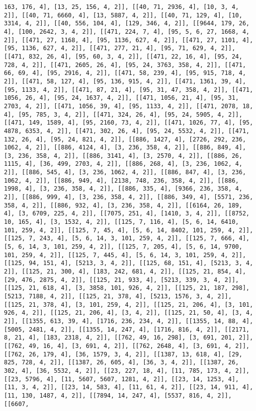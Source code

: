 \documentclass[12pt,fleqn]{article}\usepackage{../../common}
\begin{document}
\begin{verbatim}
163, 176, 4], [13, 25, 156, 4, 2]], [[40, 71, 2936, 4], [10, 3, 4, 2]], [[40, 71, 6660, 4], [13, 5887, 4, 2]], [[40, 71, 129, 4], [10, 3314, 4, 2]], [[40, 556, 104, 4], [129, 346, 4, 2]], [[9644, 179, 26, 4], [100, 2642, 3, 4, 2]], [[471, 224, 7, 4], [95, 5, 6, 27, 1668, 4, 2]], [[471, 27, 1168, 4], [95, 1136, 627, 4, 2]], [[471, 27, 1101, 4], [95, 1136, 627, 4, 2]], [[471, 277, 21, 4], [95, 71, 629, 4, 2]], [[471, 832, 26, 4], [95, 60, 3, 4, 2]], [[471, 22, 16, 4], [95, 24, 728, 4, 2]], [[471, 2605, 26, 4], [95, 24, 3763, 358, 4, 2]], [[471, 66, 69, 4], [95, 2916, 4, 2]], [[471, 58, 239, 4], [95, 915, 718, 4, 2]], [[471, 58, 127, 4], [95, 136, 915, 4, 2]], [[471, 1361, 39, 4], [95, 1133, 4, 2]], [[471, 87, 21, 4], [95, 31, 47, 358, 4, 2]], [[471, 1056, 26, 4], [95, 24, 1637, 4, 2]], [[471, 1056, 21, 4], [95, 31, 2703, 4, 2]], [[471, 1056, 39, 4], [95, 1133, 4, 2]], [[471, 2078, 18, 4], [95, 785, 3, 4, 2]], [[471, 324, 26, 4], [95, 24, 5905, 4, 2]], [[471, 149, 1589, 4], [95, 2160, 73, 4, 2]], [[471, 1026, 77, 4], [95, 4878, 6353, 4, 2]], [[471, 302, 26, 4], [95, 24, 5532, 4, 2]], [[471, 132, 26, 4], [95, 24, 821, 4, 2]], [[886, 1427, 4], [2726, 292, 236, 1062, 4, 2]], [[886, 4124, 4], [3, 236, 358, 4, 2]], [[886, 849, 4], [3, 236, 358, 4, 2]], [[886, 3141, 4], [3, 2570, 4, 2]], [[886, 26, 1115, 4], [36, 499, 2703, 4, 2]], [[886, 268, 4], [3, 236, 1062, 4, 2]], [[886, 545, 4], [3, 236, 1062, 4, 2]], [[886, 847, 4], [3, 236, 1062, 4, 2]], [[886, 949, 4], [2138, 748, 236, 358, 4, 2]], [[886, 1998, 4], [3, 236, 358, 4, 2]], [[886, 335, 4], [9366, 236, 358, 4, 2]], [[886, 999, 4], [3, 236, 358, 4, 2]], [[886, 349, 4], [5571, 236, 358, 4, 2]], [[886, 932, 4], [3, 236, 358, 4, 2]], [[6164, 26, 189, 4], [3, 6709, 225, 4, 2]], [[7075, 251, 4], [1410, 3, 4, 2]], [[8752, 10, 165, 4], [3, 1532, 4, 2]], [[125, 7, 116, 4], [5, 6, 14, 6410, 101, 259, 4, 2]], [[125, 7, 45, 4], [5, 6, 14, 8402, 101, 259, 4, 2]], [[125, 7, 243, 4], [5, 6, 14, 3, 101, 259, 4, 2]], [[125, 7, 666, 4], [5, 6, 14, 3, 101, 259, 4, 2]], [[125, 7, 205, 4], [5, 6, 14, 9700, 101, 259, 4, 2]], [[125, 7, 445, 4], [5, 6, 14, 3, 101, 259, 4, 2]], [[125, 94, 151, 4], [5213, 3, 4, 2]], [[125, 68, 151, 4], [5213, 3, 4, 2]], [[125, 21, 300, 4], [183, 242, 681, 4, 2]], [[125, 21, 854, 4], [29, 476, 2875, 4, 2]], [[125, 21, 933, 4], [5213, 339, 3, 4, 2]], [[125, 21, 618, 4], [3, 3858, 101, 926, 4, 2]], [[125, 21, 187, 298], [5213, 7188, 4, 2]], [[125, 21, 378, 4], [5213, 1576, 3, 4, 2]], [[125, 21, 378, 4], [3, 101, 259, 4, 2]], [[125, 21, 206, 4], [3, 101, 926, 4, 2]], [[125, 21, 206, 4], [3, 4, 2]], [[125, 21, 50, 4], [3, 4, 2]], [[1355, 613, 39, 4], [1716, 236, 234, 4, 2]], [[1355, 14, 88, 4], [5005, 2481, 4, 2]], [[1355, 14, 247, 4], [1716, 816, 4, 2]], [[2171, 8, 21, 4], [183, 2318, 4, 2]], [[762, 49, 16, 298], [3, 691, 201, 2]], [[762, 49, 16, 4], [3, 691, 4, 2]], [[762, 2648, 4], [3, 691, 4, 2]], [[762, 26, 179, 4], [36, 1579, 3, 4, 2]], [[1387, 13, 618, 4], [29, 825, 728, 4, 2]], [[1387, 26, 605, 4], [36, 3, 4, 2]], [[1387, 26, 302, 4], [36, 5532, 4, 2]], [[23, 227, 18, 4], [11, 785, 173, 4, 2]], [[23, 5796, 4], [11, 5607, 5607, 1281, 4, 2]], [[23, 14, 1253, 4], [11, 3, 4, 2]], [[23, 14, 583, 4], [11, 61, 4, 2]], [[23, 14, 911, 4], [11, 130, 1487, 4, 2]], [[7894, 14, 247, 4], [5537, 816, 4, 2]], [[6607, 
\end{verbatim}
\end{document}
